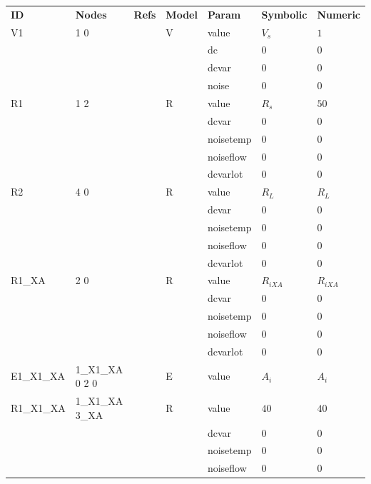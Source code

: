 \begin{table}[h]
\centering
\begin{tabular}[c]{lllllll}
\textbf{ID} & \textbf{Nodes} & \textbf{Refs} & \textbf{Model} & \textbf{Param} & \textbf{Symbolic} & \textbf{Numeric} \\ 
\rowcolor{myyellow}
\small{V1} &\small{1 0 } & &\small{V} &\small{value} &$V_{s}$ &$1$ \\ 
 & & & &\small{dc} &$0$ &$0$ \\ 
\rowcolor{myyellow}
 & & & &\small{dcvar} &$0$ &$0$ \\ 
 & & & &\small{noise} &$0$ &$0$ \\ 
\rowcolor{myyellow}
\small{R1} &\small{1 2 } & &\small{R} &\small{value} &$R_{s}$ &$50$ \\ 
 & & & &\small{dcvar} &$0$ &$0$ \\ 
\rowcolor{myyellow}
 & & & &\small{noisetemp} &$0$ &$0$ \\ 
 & & & &\small{noiseflow} &$0$ &$0$ \\ 
\rowcolor{myyellow}
 & & & &\small{dcvarlot} &$0$ &$0$ \\ 
\small{R2} &\small{4 0 } & &\small{R} &\small{value} &$R_{L}$ &$R_{L}$ \\ 
\rowcolor{myyellow}
 & & & &\small{dcvar} &$0$ &$0$ \\ 
 & & & &\small{noisetemp} &$0$ &$0$ \\ 
\rowcolor{myyellow}
 & & & &\small{noiseflow} &$0$ &$0$ \\ 
 & & & &\small{dcvarlot} &$0$ &$0$ \\ 
\rowcolor{myyellow}
\small{R1\_XA} &\small{2 0 } & &\small{R} &\small{value} &$R_{i XA}$ &$R_{i XA}$ \\ 
 & & & &\small{dcvar} &$0$ &$0$ \\ 
\rowcolor{myyellow}
 & & & &\small{noisetemp} &$0$ &$0$ \\ 
 & & & &\small{noiseflow} &$0$ &$0$ \\ 
\rowcolor{myyellow}
 & & & &\small{dcvarlot} &$0$ &$0$ \\ 
\small{E1\_X1\_XA} &\small{1\_X1\_XA 0 2 0 } & &\small{E} &\small{value} &$A_{i}$ &$A_{i}$ \\ 
\rowcolor{myyellow}
\small{R1\_X1\_XA} &\small{1\_X1\_XA 3\_XA } & &\small{R} &\small{value} &$40$ &$40$ \\ 
 & & & &\small{dcvar} &$0$ &$0$ \\ 
\rowcolor{myyellow}
 & & & &\small{noisetemp} &$0$ &$0$ \\ 
 & & & &\small{noiseflow} &$0$ &$0$ \\ 

\end{tabular}
\end{table}
